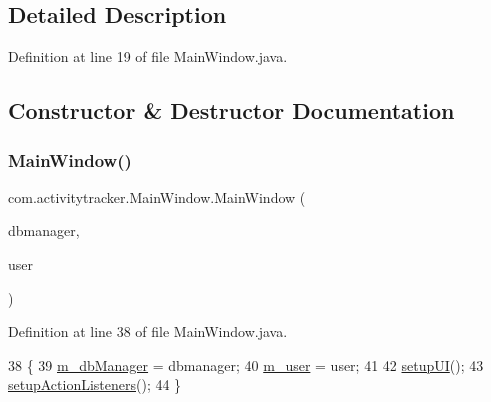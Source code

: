 \subsection{Detailed Description}


Definition at line 19 of file Main\+Window.\+java.



\subsection{Constructor \& Destructor Documentation}
\mbox{\label{classcom_1_1activitytracker_1_1_main_window_ad89306d2683db39f9d17c7b06d814bed}} 
\subsubsection{\texorpdfstring{Main\+Window()}{MainWindow()}}
{\footnotesize\ttfamily com.\+activitytracker.\+Main\+Window.\+Main\+Window (\begin{DoxyParamCaption}\item[{\mbox{\hyperlink{classcom_1_1activitytracker_1_1_d_b_manager}{D\+B\+Manager}}}]{dbmanager,  }\item[{final \mbox{\hyperlink{classcom_1_1activitytracker_1_1_user}{User}}}]{user }\end{DoxyParamCaption})\hspace{0.3cm}{\ttfamily [package]}}



Definition at line 38 of file Main\+Window.\+java.


\begin{DoxyCode}
38                                                      \{
39         \mbox{\hyperlink{classcom_1_1activitytracker_1_1_main_window_ab2af51cb35794567e55564a4d3abbb79}{m\_dbManager}} = dbmanager;
40         \mbox{\hyperlink{classcom_1_1activitytracker_1_1_main_window_a96e28fa47e1740a7ddc16aa48406db85}{m\_user}} = user;
41 
42         \mbox{\hyperlink{classcom_1_1activitytracker_1_1_main_window_a53a019623a37b950473359fc625b6423}{setupUI}}();
43         \mbox{\hyperlink{classcom_1_1activitytracker_1_1_main_window_a76b3e8567b228ccd26f09c15ebaddb72}{setupActionListeners}}();
44     \}
\end{DoxyCode}


